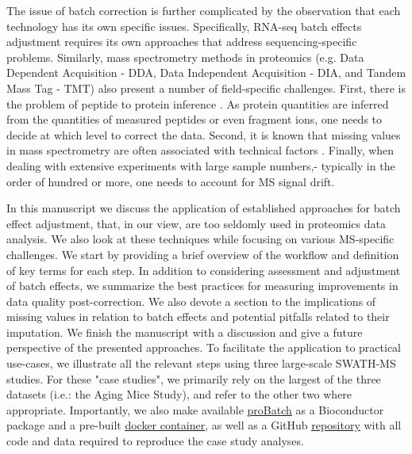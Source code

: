 \documentclass[num-refs]{wiley-article}
\begin{document}
The issue of batch correction is further complicated by the observation that each technology has its own specific issues. Specifically, RNA-seq batch effects adjustment requires its own approaches\cite{Dillies:2013aa} that address sequencing-specific problems. Similarly, mass spectrometry methods in proteomics (e.g. Data Dependent Acquisition - DDA, Data Independent Acquisition - DIA, and Tandem Mass Tag - TMT) also present a number of field-specific challenges. First, there is the problem of peptide to protein inference \cite{Clough:2012aa, Teo:2015aa, Rosenberger2014a, Choi2014, Muntel:2019aa}. As protein quantities are inferred from the quantities of measured peptides or even fragment ions, one needs to decide at which level to correct the data. Second, it is known that missing values in mass spectrometry are often associated with technical factors \cite{Karpievitch2012, Matafora2017}. Finally, when dealing with extensive experiments with large sample numbers,- typically in the order of hundred or more, one needs to account for MS signal drift. 

In this manuscript we discuss the application of established approaches for batch effect adjustment, that, in our view, are too seldomly used in proteomics data analysis. We also look at these techniques while focusing on various MS-specific challenges. We start by providing a brief overview of the workflow and definition of key terms for each step. In addition to considering assessment and adjustment of batch effects, we summarize the best practices for measuring improvements in data quality post-correction. We also devote a section to the implications of missing values in relation to batch effects and potential pitfalls related to their imputation. We finish the manuscript with a discussion and give a future perspective of the presented approaches. To facilitate the application to practical use-cases, we illustrate all the relevant steps using three large-scale SWATH-MS studies. For these "case studies", we primarily rely on the largest of the three datasets (i.e.: the Aging Mice Study), and refer to the other two where appropriate. Importantly, we also make available \underline{\href{https://bioconductor.org/packages/release/bioc/html/proBatch.html}{proBatch}} as a Bioconductor package and a pre-built \underline{\href{https://hub.docker.com/repository/docker/digitalproteomes/probatch}{docker container}}, as well as a GitHub  \underline{\href{https://github.com/symbioticMe/batch_effects_workflow_code}{repository}} with all code and data required to reproduce the case study analyses.
\end{document}
